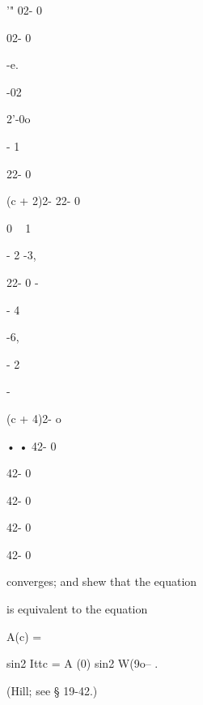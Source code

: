 '" 02- 0


02- 0


-e.


-02

2'-0o


- 1

22- 0


(c + 2)2- 22- 0


 0 ~ 1


- 2 -3,


22- 0 -


- 4


-6,


- 2


-


(c + 4)2- o


• • 42- 0


42- 0


42- 0


42- 0


42- 0



converges; and shew that the equation



is equivalent to the equation



A(c) =



sin2 Ittc = A (0) sin2 W(9o-- .



(Hill; see § 19-42.)

